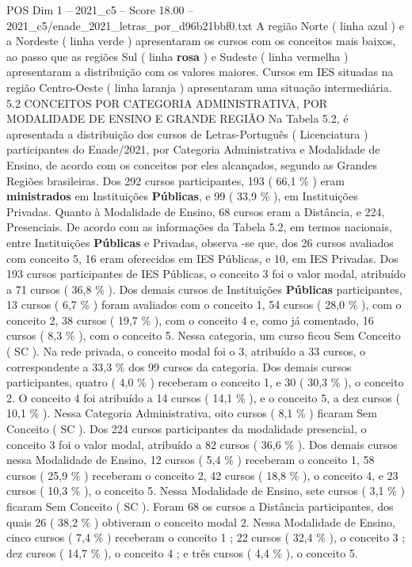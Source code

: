 \begin{textsample}{POS Dim 1 – 2021\_c5 – Score 18.00 – 2021\_c5/enade\_2021\_letras\_por\_d96b21bbf0.txt}
A região Norte ( linha azul ) e a Nordeste ( linha verde ) apresentaram os cursos com os conceitos mais baixos, ao passo que as regiões Sul ( linha \textbf{rosa} ) e Sudeste ( linha vermelha ) apresentaram a distribuição com os valores maiores.
Cursos em IES situadas na região Centro-Oeste ( linha laranja ) apresentaram uma situação intermediária. 5.2 CONCEITOS POR CATEGORIA ADMINISTRATIVA, POR MODALIDADE DE ENSINO E GRANDE REGIÃO Na Tabela 5.2, é apresentada a distribuição dos cursos de Letras-Português ( Licenciatura ) participantes do Enade/2021, por Categoria Administrativa e Modalidade de Ensino, de acordo com os conceitos por eles alcançados, segundo as Grandes Regiões brasileiras.
Dos 292 cursos participantes, 193 ( 66,1 \% ) eram \textbf{ministrados} em Instituições \textbf{Públicas}, e 99 ( 33,9 \% ), em Instituições Privadas.
Quanto à Modalidade de Ensino, 68 cursos eram a Distância, e 224, Presenciais.
De acordo com as informações da Tabela 5.2, em termos nacionais, entre Instituições \textbf{Públicas} e Privadas, observa -se que, dos 26 cursos avaliados com conceito 5, 16 eram oferecidos em IES Públicas, e 10, em IES Privadas.
Dos 193 cursos participantes de IES Públicas, o conceito 3 foi o valor modal, atribuído a 71 cursos ( 36,8 \% ).
Dos demais cursos de Instituições \textbf{Públicas} participantes, 13 cursos ( 6,7 \% ) foram avaliados com o conceito 1, 54 cursos ( 28,0 \% ), com o conceito 2, 38 cursos ( 19,7 \% ), com o conceito 4 e, como já comentado, 16 cursos ( 8,3 \% ), com o conceito 5.
Nessa categoria, um curso ficou Sem Conceito ( SC ).
Na rede privada, o conceito modal foi o 3, atribuído a 33 cursos, o correspondente a 33,3 \% dos 99 cursos da categoria.
Dos demais cursos participantes, quatro ( 4,0 \% ) receberam o conceito 1, e 30 ( 30,3 \% ), o conceito 2.
O conceito 4 foi atribuído a 14 cursos ( 14,1 \% ), e o conceito 5, a dez cursos ( 10,1 \% ).
Nessa Categoria Administrativa, oito cursos ( 8,1 \% ) ficaram Sem Conceito ( SC ).
Dos 224 cursos participantes da modalidade presencial, o conceito 3 foi o valor modal, atribuído a 82 cursos ( 36,6 \% ).
Dos demais cursos nessa Modalidade de Ensino, 12 cursos ( 5,4 \% ) receberam o conceito 1, 58 cursos ( 25,9 \% ) receberam o conceito 2, 42 cursos ( 18,8 \% ), o conceito 4, e 23 cursos ( 10,3 \% ), o conceito 5.
Nessa Modalidade de Ensino, sete cursos ( 3,1 \% ) ficaram Sem Conceito ( SC ).
Foram 68 os cursos a Distância participantes, dos quais 26 ( 38,2 \% ) obtiveram o conceito modal 2.
Nessa Modalidade de Ensino, cinco cursos ( 7,4 \% ) receberam o conceito 1 ; 22 cursos ( 32,4 \% ), o conceito 3 ; dez cursos ( 14,7 \% ), o conceito 4 ; e três cursos ( 4,4 \% ), o conceito 5.

\end{textsample}
